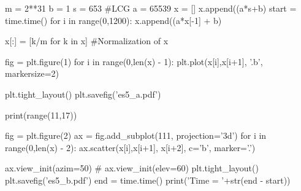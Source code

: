 \documentclass[11pt,a4paper]{article}
\begin{document}
\begin{python}
  m = 2**31
  b = 1
  s = 653
  #LCG
  a = 65539
  x = []
  x.append((a*s+b)%
  start = time.time()
  for i in range(0,1200):
    x.append((a*x[-1] + b)%

  x[:] = [k/m for k in x] #Normalization of x

  fig = plt.figure(1)
  for i in range(0,len(x) - 1):
    plt.plot(x[i],x[i+1], '.b', markersize=2)

  plt.tight_layout()
  plt.savefig('es5_a.pdf')

  print(range(11,17))

  fig = plt.figure(2)
  ax = fig.add_subplot(111, projection='3d')
  for i in range(0,len(x) - 2):
    ax.scatter(x[i],x[i+1], x[i+2], c='b', marker='.')

  ax.view_init(azim=50)
  # ax.view_init(elev=60)
  plt.tight_layout()
  plt.savefig('es5_b.pdf')
  end = time.time()
  print('Time = '+str(end - start))
\end{python}
\end{document}
